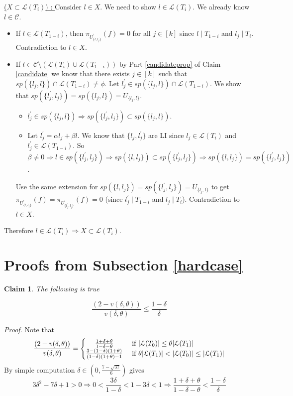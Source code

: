 \documentclass[letterpaper,USenglish,numberwithinsect]{lipics}
\newcommand{\ML}{\mathcal{L}}
\newcommand{\MC}{\mathcal{C}}
\newtheorem{claim}[theorem]{Claim}
\begin{document}
\underline{($X\subset \ML(T_i)$) : } Consider $l\in X$. We need to show $l\in
\ML(T_{i})$. We already know $l\in \MC$.
\begin{itemize}
\item  If $l\in \ML(T_{1-i})$, then $\pi_{U_{\{l,l_j\}}^\prime}
(f) = 0$ for all
$j\in [k]$ since $l\mid T_{1-i}$ and $l_j\mid T_i$.
Contradiction to $l\in X$.

\item If $l\in \MC\setminus (\ML(T_i)\cup \ML(T_{1-i}))$  by Part
\ref{candidateprop} of Claim \ref{candidate} we know that there exists
$j\in [k]$ such that $sp(\{l_{j},l\})\cap \ML(T_{1-i}) \neq \phi$. Let
$l_{j}^\prime \in sp(\{l_{j},l\})\cap \ML(T_{1-i})$. We show that
$sp(\{l_j^\prime,l_j\}) = sp(\{l_j,l\}) = U_{\{l_j,l\}}$.
\begin{itemize}
\item $l_j^\prime \in sp(\{l_j,l\})\Rightarrow sp(\{l_j^\prime,l_j\})\subset
sp(\{l_j,l\})$.	
\item Let $l_j^\prime = \alpha l_j + \beta l$. We know that $\{l_j,l_j^\prime\}$
are LI since $l_j\in \ML(T_i)$ and $l_j^\prime \in \ML(T_{1-i})$. So $\beta\neq
0 \Rightarrow l\in sp(\{l_j^\prime,l_j\})\Rightarrow sp(\{l,l_j\}) \subset
sp(\{l_j^\prime,l_j\}) \Rightarrow sp(\{l,l_j\})=sp(\{l_j^\prime,l_j\})$.
\end{itemize}
Use the same extension for $sp(\{l,l_j\})=sp(\{l_j^\prime,l_j\})= U_{\{l_j,l\}}$ to get
$\pi_{U_{\{l,l_j\}}^\prime}(f)=\pi_{U_{\{l_j^\prime,l_j\}}^\prime}
(f) =0$ (since $l_j^\prime \mid T_{1-i}$ and $l_j\mid T_i$).
Contradiction to $l\in X$.
\end{itemize}

Therefore $l\in \ML(T_i) \Rightarrow X\subset \ML(T_i)$.



\section{Proofs from Subsection \ref{hardcase}}

\begin{claim}\label{calculationproof}
The following is true

\[
  \frac{(2-v(\delta,\theta))}{v(\delta,\theta)}\leq \frac{1-\delta}{\delta}
\]

\end{claim}

\emph{Proof.}
Note that
\[
 \frac{(2-v(\delta,\theta))}{v(\delta,\theta)} =
  \begin{cases}
      \hfill \frac{1+\delta + \theta}{1-\delta-\theta}    \hfill & \text{ if
$|\ML(T_{0})|\leq \theta |\ML(T_1)|$} \\
      \hfill \frac{3-(1-\delta)(1+\theta)}{(1-\delta)(1+\theta)-1} \hfill &
\text{ if $\theta |\ML(T_1)| < |\ML(T_0)| \leq |\ML(T_1)|$} \\
  \end{cases}
\]
By simple computation $\delta \in (0, \frac{7-\sqrt{37}}{6})$ gives
\[
3\delta^2-7\delta +1 >0 \Rightarrow 0 <
\frac{3\delta}{1-\delta} < 1-3\delta < 1 \Rightarrow \frac{1+\delta +
\theta}{1-\delta-\theta}<
\frac{1-\delta}{\delta}
\]
\end{document}
